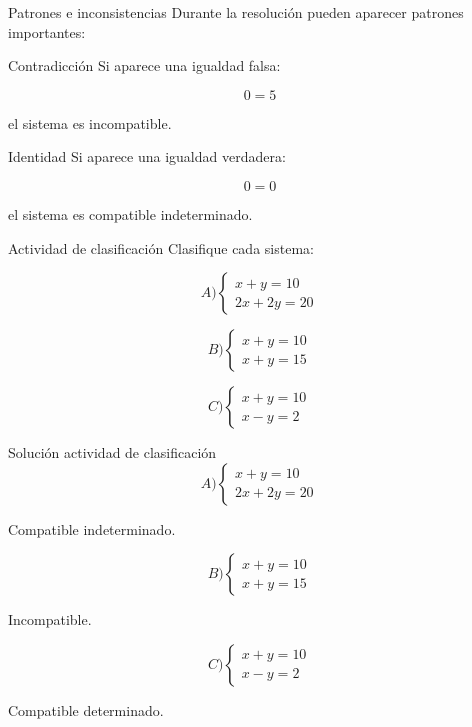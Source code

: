 \documentclass[aspectratio=169]{beamer}
\begin{document}
	\begin{frame}{Patrones e inconsistencias}
		Durante la resolución pueden aparecer patrones importantes:
		
		\bigskip
		
		\begin{block}{Contradicción}
			Si aparece una igualdad falsa:
			
			\[
			0=5
			\]
			
			el sistema es incompatible.
		\end{block}
		
		\begin{block}{Identidad}
			Si aparece una igualdad verdadera:
			
			\[
			0=0
			\]
			
			el sistema es compatible indeterminado.
		\end{block}
	\end{frame}
	
	\begin{frame}{Actividad de clasificación}
		Clasifique cada sistema:
		
		\[
		A)
		\begin{cases}
			x+y=10\\
			2x+2y=20
		\end{cases}
		\]
		
		\[
		B)
		\begin{cases}
			x+y=10\\
			x+y=15
		\end{cases}
		\]
		
		\[
		C)
		\begin{cases}
			x+y=10\\
			x-y=2
		\end{cases}
		\]
	\end{frame}
	
	\begin{frame}{Solución actividad de clasificación}
		\[
		A)
		\begin{cases}
			x+y=10\\
			2x+2y=20
		\end{cases}
		\]
		
		Compatible indeterminado.
		
		\bigskip
		
		\[
		B)
		\begin{cases}
			x+y=10\\
			x+y=15
		\end{cases}
		\]
		
		Incompatible.
		
		\bigskip
		
		\[
		C)
		\begin{cases}
			x+y=10\\
			x-y=2
		\end{cases}
		\]
		
		Compatible determinado.
	\end{frame}
	
\end{document}
